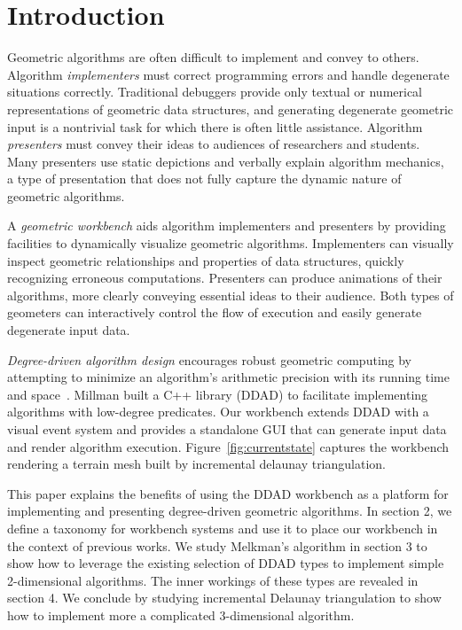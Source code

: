 \section{Introduction}

Geometric algorithms are often difficult to implement and convey to others.
Algorithm \emph{implementers} must correct programming errors and handle
degenerate situations correctly. Traditional debuggers provide only textual or
numerical representations of geometric data structures, and generating
degenerate geometric input is a nontrivial task for which there is often little
assistance. Algorithm \emph{presenters} must convey their ideas to audiences of
researchers and students. Many presenters use static depictions and verbally
explain algorithm mechanics, a type of presentation that does not fully capture
the dynamic nature of geometric algorithms.

A \emph{geometric workbench} aids algorithm implementers and presenters by
providing facilities to dynamically visualize geometric algorithms. Implementers
can visually inspect geometric relationships and properties of data structures,
quickly recognizing erroneous computations. Presenters can produce
animations of their algorithms, more clearly conveying essential
ideas to their audience. Both types of geometers can interactively control the
flow of execution and easily generate degenerate input data.


\emph{Degree-driven algorithm design} encourages robust geometric computing by
attempting to minimize an algorithm's arithmetic precision with its running time
and space~\cite{millman2012degree}. Millman built a C++ library (DDAD) to
facilitate implementing algorithms with low-degree predicates. Our workbench
extends DDAD with a visual event system and provides a standalone GUI that can
generate input data and render algorithm execution.
Figure~\ref{fig:currentstate} captures the workbench rendering a terrain mesh
built by incremental delaunay triangulation.

This paper explains the benefits of using the DDAD workbench as a platform for
implementing and presenting degree-driven geometric algorithms. In section 2, we
define a taxonomy for workbench systems and use it to place our workbench in the
context of previous works. We study Melkman's algorithm in section
3 to show how to leverage the existing selection of DDAD types to implement
simple 2-dimensional algorithms. The inner workings of these types are revealed
in section 4. We conclude by studying incremental Delaunay triangulation to show
how to implement more a complicated 3-dimensional algorithm.
% 
% 
% 

